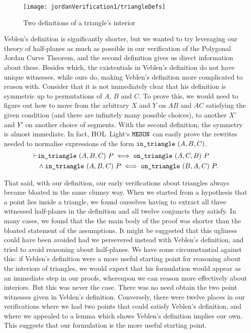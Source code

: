 \begin{figure}
\centering\texttt{[image: jordanVerification1/triangleDefs]}
\caption{Two definitions of a triangle's interior}
\label{fig:triangleDefs}
\end{figure}

Veblen's definition is significantly shorter, but we wanted to try leveraging our theory of half-planes as much as possible in our verification of the Polygonal Jordan Curve Theorem, and the second definition gives us direct information about these. Besides which, the existentials in Veblen's definition do not have unique witnesses, while ours do, making Veblen's definition more complicated to reason with. Consider that it is not immediately clear that his definition is symmetric up to permutations of $A$, $B$ and $C$. To prove this, we would need to figure out how to move from the arbitrary $X$ and $Y$ on $AB$ and $AC$ satisfying the given condition (and there are infinitely many possible choices), to another $X'$ and $Y'$ on another choice of segments. With the second definition, the symmetry is almost immediate. In fact, HOL~Light`s $\texttt{MESON}$ can easily prove the rewrites needed to normalise expressions of the form $\texttt{in\_triangle}\ (A,B,C)$. 
\begin{equation}\label{eq:triSyms}
  \begin{split}
    \vdash&\code{in\_triangle}\ (A,B,C)\ P \iff \code{on\_triangle}\ (A,C,B)\ P\\
&    \wedge \code{in\_triangle}\ (A,B,C)\ P \iff \code{on\_triangle}\ (B,A,C)\ P.
  \end{split}
\end{equation}

That said, with our definition, our early verifications about triangles always became bloated in the same clumsy way. When we started from a hypothesis that a point lies inside a triangle, we found ourselves having to extract all three witnessed half-planes in the definition and all twelve conjuncts they satisfy. In many cases, we found that the the main body of the proof was shorter than the bloated statement of the assumptions. It might be suggested that this ugliness could have been avoided had we persevered instead with Veblen's definition, and tried to avoid reasoning about half-planes. We have some circumstantial against this: if Veblen's definition were a more useful starting point for reasoning about the interiors of triangles, we would expect that his formulation would appear as an immediate step in our proofs, whereupon we can reason more effectively about interiors. But this was never the case. There was no need obtain the two point witnesses given in Veblen's definition. Conversely, there were twelve places in our verifications where we had two points that could satisfy Veblen's definition, and where we appealed to a lemma which shows Veblen's definition implies our own. This suggests that our formulation is the more useful starting point.

